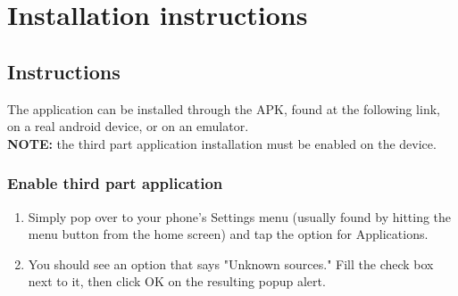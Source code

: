 \chapter{Installation instructions}

\section{Instructions}
The application can be installed through the APK, found at the following link, on a real android device, or on an emulator.\\
\textbf{NOTE:} the third part application installation must be enabled on the device.

\subsection{Enable third part application}
\begin{enumerate}
\item Simply pop over to your phone's Settings menu (usually found by hitting the menu button from the home screen) and tap the option for Applications.
\item You should see an option that says "Unknown sources." Fill the check box next to it, then click OK on the resulting popup alert.
\end{enumerate}